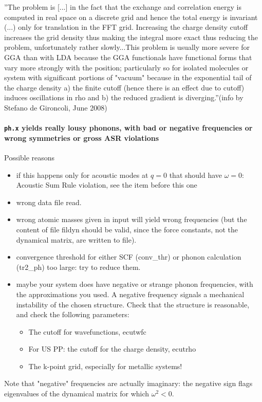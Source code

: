 \documentclass[12pt,a4paper]{article}
\def\ph.x{\texttt{ph.x}}
\begin{document}
''The problem is [...] in the fact that the exchange and correlation
energy is computed in real space on a discrete grid and hence the
total energy is invariant (...) only for translation in the FFT
grid. Increasing the charge density cutoff increases the grid density
thus making the integral more exact thus reducing the problem,
unfortunately rather slowly...This problem is usually more severe for
GGA  than with LDA because the GGA functionals have functional forms
that vary more strongly with the position; particularly so for
isolated molecules or system with significant portions of "vacuum"
because in the exponential tail of the charge density a) the finite
cutoff  (hence there is an effect due to cutoff) induces oscillations
in rho and b) the reduced gradient is diverging.''(info by Stefano de
Gironcoli, June 2008) 

\paragraph{\ph.x yields really lousy phonons, with bad or negative
  frequencies or wrong symmetries or gross ASR violations} 
Possible reasons
\begin{itemize}
\item if this happens only for acoustic modes at $q=0$ that should
  have $\omega=0$: Acoustic Sum Rule violation, see the item before
  this one 
\item wrong data file read.
\item wrong atomic masses given in input will yield wrong frequencies
  (but the content of file fildyn should be valid, since the force
  constants, not the dynamical matrix, are written to file). 
\item convergence threshold for either SCF (conv\_thr) or phonon
  calculation (tr2\_ph) too large: try to reduce them. 
\item maybe your system does have negative or strange phonon
  frequencies, with the approximations you used. A negative frequency
  signals a mechanical instability of the chosen structure. Check that
  the structure is reasonable, and check the following parameters: 
\begin{itemize}
\item The cutoff for wavefunctions, ecutwfc
\item For US PP: the cutoff for the charge density, ecutrho
\item The k-point grid, especially for metallic systems!
\end{itemize}
\end{itemize}
Note that "negative" frequencies are actually imaginary: the negative
sign flags eigenvalues of the dynamical matrix for which $\omega^2 <
0$. 
\end{document}
